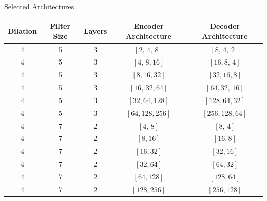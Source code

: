 \documentclass[8pt,xcolor=dvipsnames,compress]{beamer}
\begin{document}
\begin{frame}{Selected Architectures}
\footnotesize
\begin{table}[h!]
    \centering
    \renewcommand{\arraystretch}{1.4}
    \begin{tabular}{|c|c|c|c|c|}
    \hline
    \textbf{Dilation} & \textbf{Filter Size} & \textbf{Layers} & \textbf{Encoder Architecture} & \textbf{Decoder Architecture} \\
    \hline
        4 & 5 & 3 & $[2,\,4,\,8]$ & $[8,\,4,\,2]$ \\
        4 & 5 & 3 & $[4,\,8,16]$ & $[16,8,\,4]$ \\
        4 & 5 & 3 & $[8,16,32]$ & $[32,16,8]$ \\
        4 & 5 & 3 & $[16,\,32,64]$ & $[64,32,\,16]$ \\
        4 & 5 & 3 & $[32,64,128]$ & $[128,64,32]$ \\
        4 & 5 & 3 & $[64,128,256]$ & $[256,128,64]$ \\
        \hline
        4 & 7 & 2 & $[4,\,8]$ & $[8,\,4]$ \\
        4 & 7 & 2 & $[8,16]$ & $[16,8]$ \\
        4 & 7 & 2 & $[16,32]$ & $[32,16]$ \\
        4 & 7 & 2 & $[32,64]$ & $[64,32]$ \\
        4 & 7 & 2 & $[64,128]$ & $[128,64]$ \\
        4 & 7 & 2 & $[128,256]$ & $[256,128]$ \\
        \hline
     \end{tabular}
    \label{tab:tcn_architectures}
\end{table}
\end{frame}
%
\end{document}
